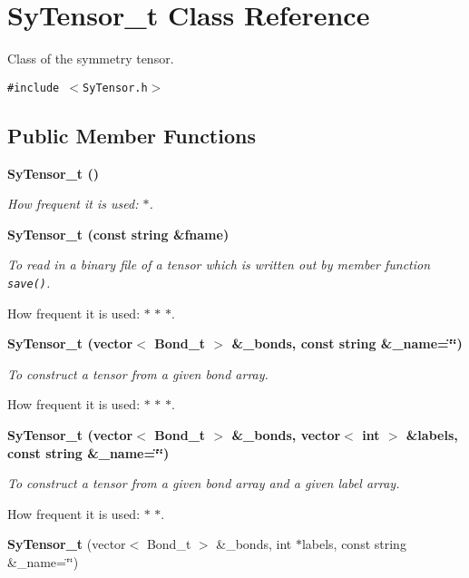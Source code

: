 \section{Sy\-Tensor\_\-t Class Reference}
\label{d1/d9f/classSyTensor__t}
Class of the symmetry tensor.  


{\tt \#include $<$Sy\-Tensor.h$>$}

\subsection*{Public Member Functions}
\begin{CompactItemize}
\item 
\bf{Sy\-Tensor\_\-t} ()
\begin{CompactList}\small\item\em How frequent it is used: $\ast$. \item\end{CompactList}\item 
\bf{Sy\-Tensor\_\-t} (const string \&fname)
\begin{CompactList}\small\item\em To read in a binary file of a tensor which is written out by member function {\tt save()}.\par
 How frequent it is used: $\ast$ $\ast$ $\ast$. \item\end{CompactList}\item 
\bf{Sy\-Tensor\_\-t} (vector$<$ Bond\_\-t $>$ \&\_\-bonds, const string \&\_\-name=\char`\"{}\char`\"{})
\begin{CompactList}\small\item\em To construct a tensor from a given bond array.\par
 How frequent it is used: $\ast$ $\ast$ $\ast$. \item\end{CompactList}\item 
\bf{Sy\-Tensor\_\-t} (vector$<$ Bond\_\-t $>$ \&\_\-bonds, vector$<$ int $>$ \&labels, const string \&\_\-name=\char`\"{}\char`\"{})
\begin{CompactList}\small\item\em To construct a tensor from a given bond array and a given label array.\par
 How frequent it is used: $\ast$ $\ast$. \item\end{CompactList}\item 
\textbf{Sy\-Tensor\_\-t} (vector$<$ Bond\_\-t $>$ \&\_\-bonds, int $\ast$labels, const string \&\_\-name=\char`\"{}\char`\"{})\label{d1/d9f/classSyTensor__t_9b559c0650ca8356c282a9e26b91653a}


\end{CompactItemize}
